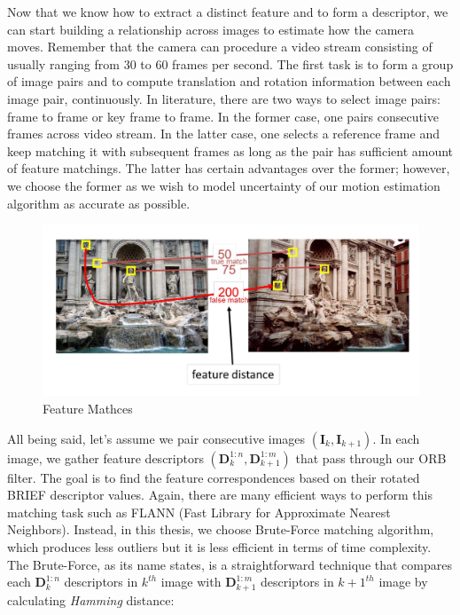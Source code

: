 \documentclass[a4paper]{report}
\numberwithin{figure}{section}
\begin{document}
Now that we know how to extract a distinct feature and to form a descriptor, 
we can start building a relationship across images to estimate how the camera 
moves. Remember that 
the camera can procedure
a video stream consisting of usually ranging from 30 to 60 frames per second. 
The first task is to form a group of image pairs and to compute translation and rotation 
information between each image pair, continuously. In literature, there are two ways to 
select image pairs: 
frame to frame or key frame to frame. In the former case, one pairs consecutive 
frames across video stream. In the latter case, one selects a reference 
frame and keep matching it with subsequent frames as long as the pair has 
sufficient amount of feature matchings. The latter has certain advantages over 
the former; however, we choose the former as we wish to model uncertainty 
of our motion estimation algorithm as accurate as possible. 

\begin{figure}[H]
	\centering
	\includegraphics[width=\linewidth,natwidth=640,natheight=640]
  {fig/ref_imgs/feature_matching.png}
  \caption{Feature Mathces}
	\label{fig:feature_matchings}
\end{figure}


All being said, 
let's assume we pair consecutive images
$(\mathbf{I}_k, \mathbf{I}_{k+1})$. 
In each image, we gather feature descriptors 
$(\mathbf{D}_k^{1:n}, \mathbf{D}_{k+1}^{1:m})$ that pass through our ORB 
filter. The goal is to find the feature correspondences based on their 
rotated BRIEF descriptor values. Again, there are many efficient ways to 
perform this matching task such as FLANN 
(Fast Library for Approximate Nearest Neighbors). 
Instead, in this thesis, we choose Brute-Force matching algorithm, which
produces less outliers but it is less efficient in terms of time complexity.
The Brute-Force, as its name states, is a straightforward technique
that compares each $\mathbf{D}_{k}^{1:n}$ descriptors in $k^{th}$ image 
with $\mathbf{D}_{k+1}^{1:m}$ descriptors in $k+1^{th}$ image by calculating 
\textit{Hamming} distance:
\end{document}
